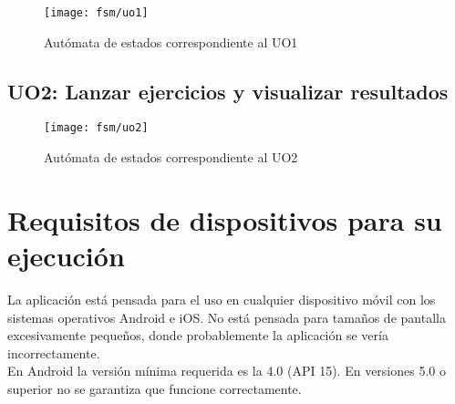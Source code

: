 \begin{figure}[H]
	\centering
	\texttt{[image: fsm/uo1]}
	\caption{Autómata de estados correspondiente al UO1}
	\label{fig:analisis-de-requisitos:funcionales:uo1:fsm}
\end{figure}

\subsection{UO2: Lanzar ejercicios y visualizar resultados}
\label{analisis-de-requisitos:funcionales:uo2}

\begin{figure}[H]
	\centering
	\texttt{[image: fsm/uo2]}
	\caption{Autómata de estados correspondiente al UO2}
	\label{fig:analisis-de-requisitos:funcionales:uo2:fsm}
\end{figure}

\section{Requisitos de dispositivos para su ejecución}
\label{analisis-de-requisitos:dispositivos}

La aplicación está pensada para el uso en cualquier dispositivo móvil con los sistemas operativos Android e iOS. No está pensada para tamaños de pantalla excesivamente pequeños, donde probablemente la aplicación se vería incorrectamente.\\

En Android la versión mínima requerida es la 4.0 (API 15). En versiones 5.0 o superior no se garantiza que funcione correctamente.\\